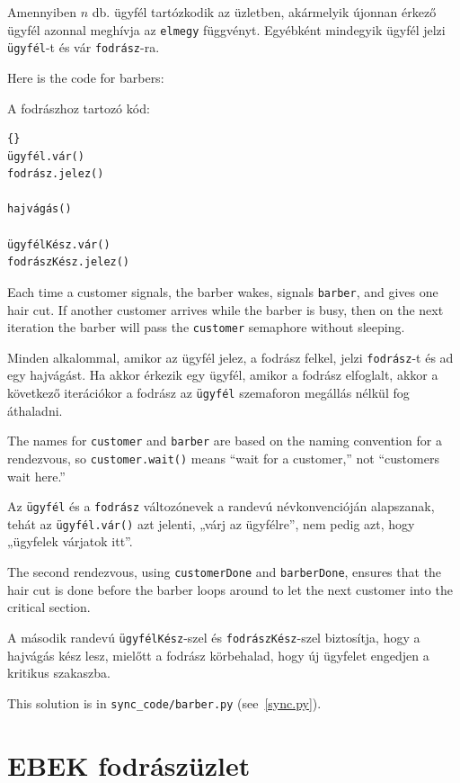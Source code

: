 \documentclass{book}
\newcommand{\clearemptydoublepage}{\newpage\cleardoublepage}
\begin{document}
Amennyiben $n$ db. ügyfél tartózkodik az üzletben, akármelyik újonnan
érkező ügyfél azonnal meghívja az {\tt elmegy} függvényt. Egyébként mindegyik
ügyfél jelzi {\tt ügyfél}-t és vár {\tt fodrász}-ra.


Here is the code for barbers:

A fodrászhoz tartozó kód:



\begin{lstlisting}[title={Fodrászüzlet megoldás (ügyfél)}]{}
ügyfél.vár()
fodrász.jelez()

hajvágás()

ügyfélKész.vár()
fodrászKész.jelez()

\end{lstlisting}

Each time a customer signals,
the barber wakes, signals {\tt barber}, and gives one
hair cut.  If another customer arrives while the barber
is busy, then on the next iteration the barber will pass
the {\tt customer} semaphore without sleeping.

Minden alkalommal, amikor az ügyfél jelez, a fodrász felkel, jelzi
{\tt fodrász}-t és ad egy hajvágást. Ha akkor érkezik egy ügyfél, amikor
a fodrász elfoglalt, akkor a következő iterációkor a fodrász az {\tt ügyfél}
szemaforon megállás nélkül fog áthaladni.

The names for {\tt customer} and {\tt barber} are based on
the naming convention for a rendezvous, so {\tt customer.wait()}
means ``wait for a customer,'' not ``customers wait here.''

Az {\tt ügyfél} és a {\tt fodrász} változónevek a randevú névkonvencióján alapszanak, tehát
az {\tt ügyfél.vár()} azt jelenti, „várj az ügyfélre”, nem pedig azt, hogy „ügyfelek várjatok itt”.

The second rendezvous, using {\tt customerDone} and {\tt barberDone},
ensures that the hair cut is done before the barber loops around to
let the next customer into the critical section.

A második randevú {\tt ügyfélKész}-szel és {\tt fodrászKész}-szel
biztosítja, hogy a hajvágás kész lesz, mielőtt a fodrász körbehalad,
hogy új ügyfelet engedjen a kritikus szakaszba.

This solution is in \verb"sync_code/barber.py" (see~\ref{sync.py}).


\clearemptydoublepage
\section{EBEK fodrászüzlet}
\end{document}
